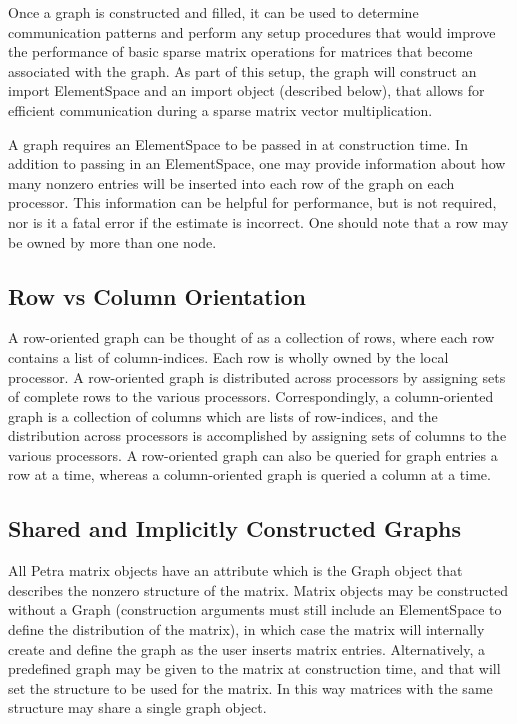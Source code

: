 \documentclass[12pt,relax]{PetraObjectModel}
\begin{document}
Once a graph is constructed and filled, it can be used to determine
communication patterns and perform any setup procedures that would improve
the performance of basic sparse matrix operations for matrices that become
associated with the graph.  As part of this setup, the graph will construct
an import ElementSpace and an import object (described below), that allows for
efficient communication during a sparse matrix vector multiplication.

A graph requires an ElementSpace to be passed in at construction time.
In addition to passing in an ElementSpace, one may provide
information about how many nonzero entries will be inserted into each row 
of the graph on each processor.  This information can be helpful for
performance, but is not required, nor is it a fatal error if the estimate
is incorrect.  One should note that a row may be owned by more than one node.

\subsection{Row vs Column Orientation}
A row-oriented graph can be thought of as a collection of rows, where each row
contains a list of column-indices. Each row is wholly owned by the local
processor. A row-oriented graph is distributed across processors by assigning
sets of complete rows to the various processors. Correspondingly, a
column-oriented graph is a collection of columns which are lists of row-indices,
and the distribution across processors is accomplished by assigning sets of
columns to the various processors.
A row-oriented graph can also be queried for graph entries a row at a time,
whereas a column-oriented graph is queried a column at a time.

\subsection{Shared and Implicitly Constructed Graphs}
All Petra matrix objects have an attribute which is the Graph object that
describes the nonzero structure of the matrix. Matrix objects may be constructed
without a Graph (construction arguments must still include an ElementSpace to
define the
distribution of the matrix), in which case the matrix will internally create
and define the graph as the user inserts matrix entries. Alternatively, a
predefined graph
may be given to the matrix at construction time, and that will set the
structure to be used for the matrix. In this way matrices with the same
structure may share a single graph object.
\end{document}
